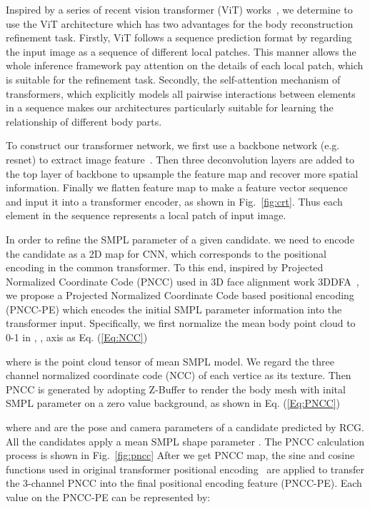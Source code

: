 \documentclass[sigconf]{acmart}
\begin{document}
Inspired by a series of recent vision transformer (ViT) works~\cite{carion2020end, dosovitskiy2020image, chen2020pre, zheng2020rethinking}, 
we determine to use the ViT architecture which has two advantages for 
the body reconstruction refinement task. Firstly, ViT follows a sequence prediction format by regarding the input image as a sequence of different local patches. This manner allows the whole inference framework pay attention on the details of each local patch, which is suitable for the refinement task. Secondly, the self-attention mechanism of transformers, which explicitly models all pairwise interactions between elements in a sequence makes our architectures particularly suitable for learning the relationship of different body parts. 


To construct our transformer network, we first use a backbone network (e.g. resnet) to extract 
image feature~\cite{chen2020pre}. Then three deconvolution layers are added to the top layer of backbone 
to upsample the feature map and recover more spatial information. 
Finally we flatten feature map to make a feature vector sequence and input it into a transformer encoder, as 
shown in Fig.~\ref{fig:crt}. Thus each element in the sequence represents a local patch 
of input image.  

In order to refine the SMPL parameter of a given candidate. we need to encode the candidate 
as a 2D map for CNN, which corresponds to the positional encoding in the common transformer. To this end, inspired by 
Projected Normalized Coordinate Code (PNCC) used in 3D face alignment work 3DDFA~\cite{zhu2016face}, we propose a Projected 
Normalized Coordinate Code based positional encoding (PNCC-PE) which 
encodes the initial SMPL parameter information into the transformer input. 
Specifically, we first normalize the mean body point cloud to 0-1 in , ,  axis as Eq. (\ref{Eq:NCC})

where  is the point cloud tensor of mean SMPL model. We regard the 
three channel normalized coordinate code (NCC) of each vertice as its texture. Then 
PNCC is generated by adopting Z-Buffer to render the body mesh with inital SMPL parameter on a zero 
value background, as shown in  Eq. (\ref{Eq:PNCC})

where  and  are the pose and camera parameters of a candidate predicted by RCG. 
All the candidates apply a mean SMPL shape parameter . 
The PNCC calculation process is shown in Fig.~\ref{fig:pncc} 
After we get PNCC map, the sine and cosine functions used in original 
transformer positional encoding~\cite{vaswani2017attention} are applied to transfer the 3-channel PNCC 
into the final positional encoding feature (PNCC-PE). Each value on the PNCC-PE can be represented by: 
\end{document}
